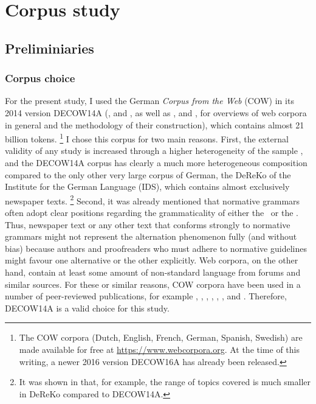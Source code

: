 \section{Corpus study}
\label{sec:corpusstudies}

\subsection{Preliminiaries}

\subsubsection{Corpus choice}
\label{sec:gettingdata}

For the present study, I used the German \textit{Corpus from the Web} (COW) in its 2014 version DECOW14A (\citealp{SchaeferBildhauer2012full}, and \citealp{Schaefer2015b}, as well as \citealp{BiemannEa2013}, and \citealp{SchaeferBildhauer2013}, for overviews of web corpora in general and the methodology of their construction), which contains almost 21 billion tokens.%
\footnote{The COW corpora (Dutch, English, French, German, Spanish, Swedish) are made available for free at \url{https://www.webcorpora.org}.
At the time of this writing, a newer 2016 version DECOW16A has already been released.}
I chose this corpus for two main reasons.
First, the external validity of any study is increased through a higher heterogeneity of the sample \citep[30]{MaxwellDelaney2004}, and the DECOW14A corpus has clearly a much more heterogeneous composition compared to the only other very large corpus of German, the DeReKo \citep{KupietzEa2010} of the Institute for the German Language (IDS), which contains almost exclusively newspaper texts.%
\footnote{It was shown in \cite{W16-2601} that, for example, the range of topics covered is much smaller in DeReKo compared to DECOW14A.}
Second, it was already mentioned that normative grammars often adopt clear positions regarding the grammaticality of either the \NACa\ or the \PGCa.
Thus, newspaper text or any other text that conforms strongly to normative grammars might not represent the alternation phenomenon fully (and without bias) because authors and proofreaders who must adhere to normative guidelines might favour one alternative or the other explicitly.
Web corpora, on the other hand, contain at least some amount of non-standard language from forums and similar sources.
For these or similar reasons, COW corpora have been used in a number of peer-reviewed publications, for example \cite{VanGoethemHiligsmann2014}, \cite{VanGoethemHuening2015}, \cite{MuellerS2014}, \cite{Schaefer2016c}, \cite{SchaeferSayatz2014}, \cite{SchaeferSayatz2016}, and \cite{Zimmer2015}. 
Therefore, DECOW14A is a valid choice for this study.


